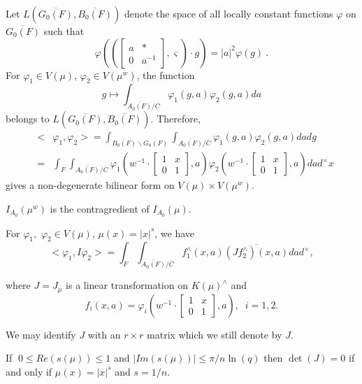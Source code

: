 Let $L(\overline{G_0(F)},\overline{B_0(F)})$ denote the space of all locally
constant functions $\varphi $ on $\overline{G_0(F)}$ such that 
\[
\varphi ((\left[ 
\begin{array}{cc}
a & * \\ 
0 & a^{-1}
\end{array}
\right] ,\varsigma )\cdot g)=|a|^2\varphi (g)\ . 
\]
For $\varphi _1\in V(\mu )$, $\varphi _2\in V(\mu ^w)$, the function 
\[
g\longmapsto \int_{\overline{A_0(F)}/\overline{C}}\varphi _1(g,a)\varphi
_2(g,a)da 
\]
belongs to $L(\overline{G_0(F)},\overline{B_0(F)})$. Therefore, 
\begin{eqnarray*}
  &<&\varphi _1,\varphi _2>
  =\int_{\overline{B_0(F)}\backslash \overline{G_0(F)}}
  \int_{\overline{A_0(F)}/\overline{C}}\varphi _1(g,a)\varphi _2(g,a)dadg \\
&=&\int_F\int_{\overline{A_0(F)}/\overline{C}}\varphi _1(w^{-1}\cdot \left[ 
\begin{array}{cc}
1 & x \\ 
0 & 1
\end{array}
\right] ,a)\varphi _2(w^{-1}\cdot \left[ 
\begin{array}{cc}
1 & x \\ 
0 & 1
\end{array}
\right] ,a)dad^{\times }x
\end{eqnarray*}
gives a non-degenerate bilinear form on $V(\mu )\times V(\mu ^w)$.

\begin{lemma}
$I_{A_0}(\mu ^w)$ is the contragredient of $I_{A_0}(\mu )$.
\end{lemma}

\begin{lemma}
For $\varphi _1,$ $\varphi _2\in V(\mu )$, $\mu (x)=|x|^s$, we have 
\[
<\varphi _1,I\varphi _2>=\int_F\int_{\overline{A_0(F)}/\overline{C}%
}f_1^{\wedge }(x,a)\overline{(Jf_2^{\wedge })(x,a)}dad^{\times },
\]

where $J=J_\mu $ is a linear transformation on $K(\mu )^{\wedge }$ and 
\[
f_i(x,a)=\varphi _i(w^{-1}\cdot \left[ 
\begin{array}{cc}
1 & x \\ 
0 & 1
\end{array}
\right] ,a),\;\;i=1,2.
\]
\end{lemma}

We may identify $J$ with an $r\times r$ matrix which we still denote by $J$.

\begin{conjecture}
If $\;0\leq Re(s(\mu ))\leq 1$ and $|Im(s(\mu ))|\leq \pi /n\ln (q)$ then $%
\det (J)=0$ if and only if $\mu (x)=|x|^s$ and $s=1/n$.
\end{conjecture}

